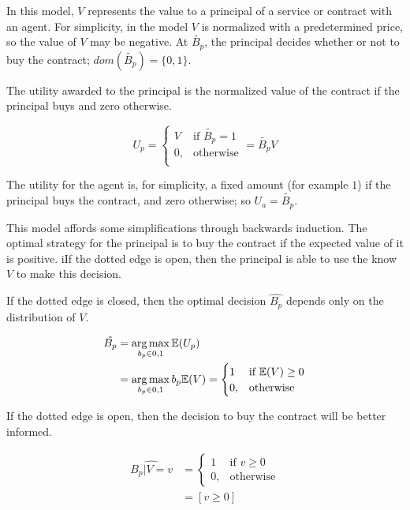 \documentclass[../thesis.tex]{subfiles}
\begin{document}
In this model, $V$ represents the value to a principal
of a service or contract with an agent.
For simplicity, in the model $V$ is normalized
with a predetermined price, so the value of $V$
may be negative.
At $\tilde{B_p}$, the principal decides whether or not to buy
the contract; $dom(\tilde{B_p}) = \{0,1\}$.

The utility awarded to the principal is the normalized
value of the contract if the principal buys and zero
otherwise.

$$U_p = \begin{cases}
               V & \text{if } \tilde{B_p} = 1 \\
               0, & \text{otherwise}\\
\end{cases} = \tilde{B_p} V$$

The utility for the agent is, for simplicity, 
a fixed amount (for example $1$) if the principal buys the contract,
and zero otherwise; so $U_a = \tilde{B_p}$.

This model affords some simplifications through backwards 
induction.
The optimal strategy for the principal is 
to buy the contract if the expected value of it is positive.
iIf the dotted edge is open, then the principal is able to use
the know $V$ to make this decision.

If the dotted edge is closed, then the optimal
decision $\hat{B_p}$ depends only on
the distribution of $V$.

\begin{equation}
  \begin{split}
    \hat{B_p} & = \operatorname*{arg\,max}_{b_p \in {0,1}} \mathbb{E}(U_p) \\
      & = \operatorname*{arg\,max}_{b_p \in {0,1}} b_p \mathbb{E}(V) = \begin{cases}
      1 & \text{if } \mathbb{E}(V) \geq 0 \\
      0, & \text{otherwise}\\
    \end{cases}
  \end{split}
\end{equation}


If the dotted edge is open, then the decision to buy
the contract will be better informed.

\begin{equation}
  \begin{split}
    \hat{B_p \vert V = v} & = \begin{cases}
      1 & \text{if } v \geq 0 \\
      0, & \text{otherwise}
    \end{cases} \\
    & = [v \geq 0]
  \end{split}
\end{equation}
\end{document}
